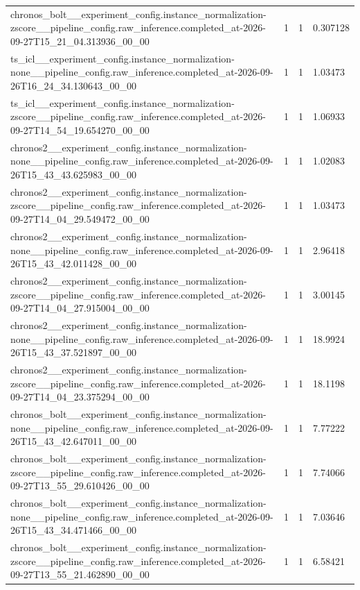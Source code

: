 \begin{tabular}{llll}
chronos\_bolt\_\_experiment\_config.instance\_normalization-zscore\_\_pipeline\_config.raw\_inference.completed\_at-2026-09-27T15\_21\_04.313936\_00\_00 & 1 & 1 & 0.307128 \\
ts\_icl\_\_experiment\_config.instance\_normalization-none\_\_pipeline\_config.raw\_inference.completed\_at-2026-09-26T16\_24\_34.130643\_00\_00 & 1 & 1 & 1.03473 \\
ts\_icl\_\_experiment\_config.instance\_normalization-zscore\_\_pipeline\_config.raw\_inference.completed\_at-2026-09-27T14\_54\_19.654270\_00\_00 & 1 & 1 & 1.06933 \\
chronos2\_\_experiment\_config.instance\_normalization-none\_\_pipeline\_config.raw\_inference.completed\_at-2026-09-26T15\_43\_43.625983\_00\_00 & 1 & 1 & 1.02083 \\
chronos2\_\_experiment\_config.instance\_normalization-zscore\_\_pipeline\_config.raw\_inference.completed\_at-2026-09-27T14\_04\_29.549472\_00\_00 & 1 & 1 & 1.03473 \\
chronos2\_\_experiment\_config.instance\_normalization-none\_\_pipeline\_config.raw\_inference.completed\_at-2026-09-26T15\_43\_42.011428\_00\_00 & 1 & 1 & 2.96418 \\
chronos2\_\_experiment\_config.instance\_normalization-zscore\_\_pipeline\_config.raw\_inference.completed\_at-2026-09-27T14\_04\_27.915004\_00\_00 & 1 & 1 & 3.00145 \\
chronos2\_\_experiment\_config.instance\_normalization-none\_\_pipeline\_config.raw\_inference.completed\_at-2026-09-26T15\_43\_37.521897\_00\_00 & 1 & 1 & 18.9924 \\
chronos2\_\_experiment\_config.instance\_normalization-zscore\_\_pipeline\_config.raw\_inference.completed\_at-2026-09-27T14\_04\_23.375294\_00\_00 & 1 & 1 & 18.1198 \\
chronos\_bolt\_\_experiment\_config.instance\_normalization-none\_\_pipeline\_config.raw\_inference.completed\_at-2026-09-26T15\_43\_42.647011\_00\_00 & 1 & 1 & 7.77222 \\
chronos\_bolt\_\_experiment\_config.instance\_normalization-zscore\_\_pipeline\_config.raw\_inference.completed\_at-2026-09-27T13\_55\_29.610426\_00\_00 & 1 & 1 & 7.74066 \\
chronos\_bolt\_\_experiment\_config.instance\_normalization-none\_\_pipeline\_config.raw\_inference.completed\_at-2026-09-26T15\_43\_34.471466\_00\_00 & 1 & 1 & 7.03646 \\
chronos\_bolt\_\_experiment\_config.instance\_normalization-zscore\_\_pipeline\_config.raw\_inference.completed\_at-2026-09-27T13\_55\_21.462890\_00\_00 & 1 & 1 & 6.58421 \\

\end{tabular}
